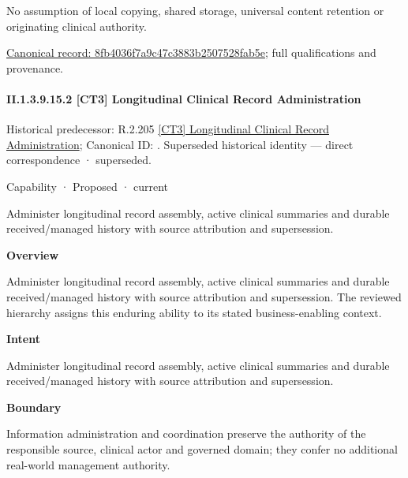 No assumption of local copying, shared storage, universal content retention or originating clinical authority.


{\footnotesize \href{../../../../../../../continuum/strategy/capability/feature/8fb4036f7a9c47c3883b2507528fab5e.md}{Canonical record: 8fb4036f7a9c47c3883b2507528fab5e}; full qualifications and provenance.}\par
\paragraph*{II.1.3.9.15.2 [CT3] Longitudinal Clinical Record Administration}
\label{navigation:II.1.3.9.15.2}

{\small Historical predecessor: R.2.205 \hyperref[element:bd91d848cf424c42bec7c80cd32edd28]{[CT3] Longitudinal Clinical Record Administration}; Canonical ID: \texttt{}. Superseded historical identity — direct correspondence · superseded.}\par
\label{element:14748dc6117f4b6ba7c0fc554b76bd89}
{\small Capability · Proposed · current}\par

Administer longitudinal record assembly, active clinical summaries and durable received/managed history with source attribution and supersession.



\textbf{Overview}



Administer longitudinal record assembly, active clinical summaries and durable received/managed history with source attribution and supersession. The reviewed hierarchy assigns this enduring ability to its stated business-enabling context.



\textbf{Intent}



Administer longitudinal record assembly, active clinical summaries and durable received/managed history with source attribution and supersession.



\textbf{Boundary}



Information administration and coordination preserve the authority of the responsible source, clinical actor and governed domain; they confer no additional real-world management authority.


